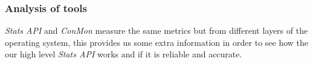 %




\subsubsection{Analysis of tools}

{\it Stats API} and {\it ConMon} measure the same metrics but from different layers of the operating system, this provides us some extra information in order to see how the our high level {\it Stats API} works and if it is reliable and accurate.

